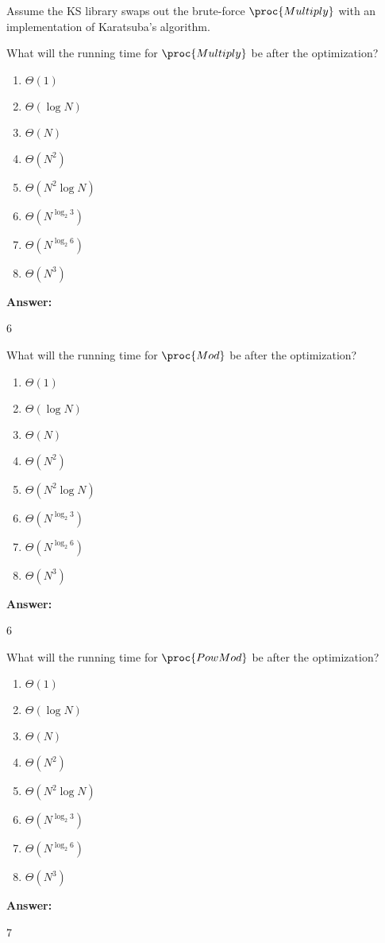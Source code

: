 \documentclass[12pt,twoside]{article}
\newcommand{\answer}{
 \par\medskip
 \textbf{Answer:}
}
\newcommand{\answerIm}{ \answer
6
}
\newcommand{\answerIn}{ \answer
6
}
\newcommand{\answerIo}{ \answer
7
}
\begin{document}
\begin{problems}
\begin{problemparts}
\end{problemparts}

Assume the KS library swaps out the brute-force $\proc{Multiply}$ with an
implementation of Karatsuba's algorithm.

\begin{problemparts}
\problempart {} What will the running time for $\proc{Multiply}$ be
after the optimization?
\begin{enumerate}
  \item $\Theta(1)$
  \item $\Theta(\log N)$
  \item $\Theta(N)$
  \item $\Theta(N^2)$
  \item $\Theta(N^2 \log N)$
  \item $\Theta(N^{\log_2 3})$
  \item $\Theta(N^{\log_2 6})$
  \item $\Theta(N^3)$
\end{enumerate}
\answerIm

\problempart {} What will the running time for $\proc{Mod}$ be after
the optimization?
\begin{enumerate}
  \item $\Theta(1)$
  \item $\Theta(\log N)$
  \item $\Theta(N)$
  \item $\Theta(N^2)$
  \item $\Theta(N^2 \log N)$
  \item $\Theta(N^{\log_2 3})$
  \item $\Theta(N^{\log_2 6})$
  \item $\Theta(N^3)$
\end{enumerate}
\answerIn

\problempart {} What will the running time for $\proc{PowMod}$ be after
the optimization?
\begin{enumerate}
  \item $\Theta(1)$
  \item $\Theta(\log N)$
  \item $\Theta(N)$
  \item $\Theta(N^2)$
  \item $\Theta(N^2 \log N)$
  \item $\Theta(N^{\log_2 3})$
  \item $\Theta(N^{\log_2 6})$
  \item $\Theta(N^3)$
\end{enumerate}
\answerIo


\end{problemparts}
\end{problems}
\end{document}
